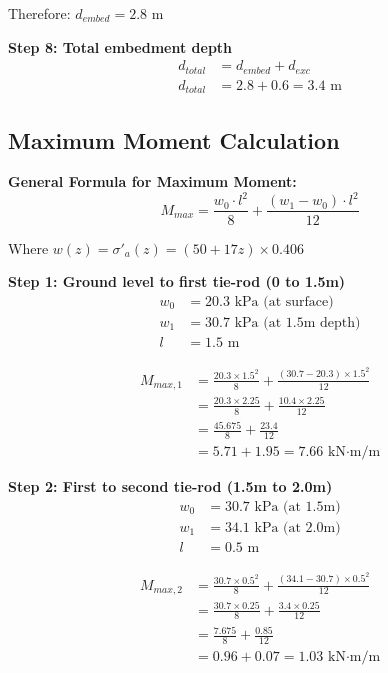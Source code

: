 \documentclass[10pt,a4paper,twocolumn]{article}
\begin{document}
Therefore: $d_{embed} = 2.8$ m

\textbf{Step 8: Total embedment depth}
\begin{align}
d_{total} &= d_{embed} + d_{exc} \\
d_{total} &= 2.8 + 0.6 = 3.4 \text{ m}
\end{align}

\subsection{Maximum Moment Calculation }

\textbf{General Formula for Maximum Moment:}
\begin{equation}
M_{max} = \frac{w_0 \cdot l^2}{8} + \frac{(w_1 - w_0) \cdot l^2}{12}
\end{equation}

Where $w(z) = \sigma'_a(z) = (50 + 17z) \times 0.406$

\textbf{Step 1: Ground level to first tie-rod (0 to 1.5m)}
\begin{align}
w_0 &= 20.3 \text{ kPa (at surface)} \\
w_1 &= 30.7 \text{ kPa (at 1.5m depth)} \\
l &= 1.5 \text{ m}
\end{align}

\begin{align}
M_{max,1} &= \frac{20.3 \times 1.5^2}{8} + \frac{(30.7 - 20.3) \times 1.5^2}{12} \\
&= \frac{20.3 \times 2.25}{8} + \frac{10.4 \times 2.25}{12} \\
&= \frac{45.675}{8} + \frac{23.4}{12} \\
&= 5.71 + 1.95 = 7.66 \text{ kN·m/m}
\end{align}

\textbf{Step 2: First to second tie-rod (1.5m to 2.0m)}
\begin{align}
w_0 &= 30.7 \text{ kPa (at 1.5m)} \\
w_1 &= 34.1 \text{ kPa (at 2.0m)} \\
l &= 0.5 \text{ m}
\end{align}

\begin{align}
M_{max,2} &= \frac{30.7 \times 0.5^2}{8} + \frac{(34.1 - 30.7) \times 0.5^2}{12} \\
&= \frac{30.7 \times 0.25}{8} + \frac{3.4 \times 0.25}{12} \\
&= \frac{7.675}{8} + \frac{0.85}{12} \\
&= 0.96 + 0.07 = 1.03 \text{ kN·m/m}
\end{align}
\end{document}
